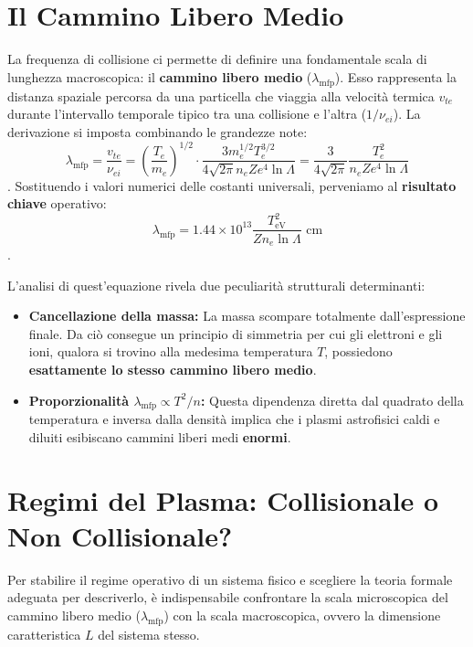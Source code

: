 \section{Il Cammino Libero Medio}

La frequenza di collisione ci permette di definire una fondamentale scala di lunghezza macroscopica: il \textbf{cammino libero medio} ($\lambda_{\text{mfp}}$). Esso rappresenta la distanza spaziale percorsa da una particella che viaggia alla velocità termica $v_{te}$ durante l'intervallo temporale tipico tra una collisione e l'altra ($1/\nu_{ei}$).
La derivazione si imposta combinando le grandezze note:
\begin{equation}
\lambda_{\text{mfp}} = \frac{v_{te}}{\nu_{ei}} = \left(\frac{T_e}{m_e}\right)^{1/2} \cdot \frac{3 m_e^{1/2} T_e^{3/2}}{4\sqrt{2\pi} n_e Z e^4 \ln \Lambda} = \frac{3}{4\sqrt{2\pi}} \frac{T_e^2}{n_e Z e^4 \ln \Lambda}
\end{equation}
.
Sostituendo i valori numerici delle costanti universali, perveniamo al \textbf{risultato chiave} operativo:
\begin{equation}
\lambda_{\text{mfp}} = 1.44 \times 10^{13} \frac{T_{\text{eV}}^2}{Z n_e \ln \Lambda} \text{ cm}
\end{equation}
.

L'analisi di quest'equazione rivela due peculiarità strutturali determinanti:
\begin{itemize}
\item \textbf{Cancellazione della massa:} La massa scompare totalmente dall'espressione finale. Da ciò consegue un principio di simmetria per cui gli elettroni e gli ioni, qualora si trovino alla medesima temperatura $T$, possiedono \textbf{esattamente lo stesso cammino libero medio}.
\item \textbf{Proporzionalità $\lambda_{\text{mfp}} \propto T^2/n$:} Questa dipendenza diretta dal quadrato della temperatura e inversa dalla densità implica che i plasmi astrofisici caldi e diluiti esibiscano cammini liberi medi \textbf{enormi}.
\end{itemize}

\section{Regimi del Plasma: Collisionale o Non Collisionale?}

Per stabilire il regime operativo di un sistema fisico e scegliere la teoria formale adeguata per descriverlo, è indispensabile confrontare la scala microscopica del cammino libero medio ($\lambda_{\text{mfp}}$) con la scala macroscopica, ovvero la dimensione caratteristica $L$ del sistema stesso.

